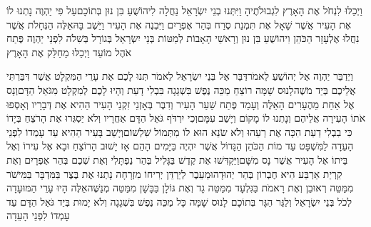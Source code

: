 \documentclass[../main/main.tex]{subfiles}
\begin{document}
\begin{multicols*}{\ncols}
וַיְכַלּוּ לִנְחֹל אֶת הָאָרֶץ לִגְבוּלֹתֶיהָ וַיִּתְּנוּ בְנֵי יִשְׂרָאֵל נַחֲלָה לִיהוֹשֻׁעַ בִּן נוּן בְּתוֹכָם\PreVerseSpace{}עַל פִּי יַהְוֶה נָתְנוּ לוֹ אֶת הָעִיר אֲשֶׁר שָׁאָל אֶת תִּמְנַת סֶרַח בְּהַר אֶפְרָיִם וַיִּבְנֶה אֶת הָעִיר וַיֵּשֶׁב בָּהּ\PreVerseSpace{}אֵלֶּה הַנְּחָלֹת אֲשֶׁר נִחֲלוּ אֶלְעָזָר הַכֹּהֵן וִיהוֹשֻׁעַ בִּן נוּן וְרָאשֵׁי הָאָבוֹת לְמַטּוֹת בְּנֵי יִשְׂרָאֵל בְּגוֹרָל בְּשִׁלֹה לִפְנֵי יַהְוֶה פֶּתַח אֹהֶל מוֹעֵד וַיְכַלּוּ מֵחַלֵּק אֶת הָאָרֶץ\OpenSection{}\par
{}וַיְדַבֵּר יַהְוֶה אֶל יְהוֹשֻׁעַ לֵאמֹר\PreVerseSpace{}דַּבֵּר אֶל בְּנֵי יִשְׂרָאֵל לֵאמֹר תְּנוּ לָכֶם אֶת עָרֵי הַמִּקְלָט אֲשֶׁר דִּבַּרְתִּי אֲלֵיכֶם בְּיַד מֹשֶׁה\PreVerseSpace{}לָנוּס שָׁמָּה רוֹצֵחַ מַכֵּה נֶפֶשׁ בִּשְׁגָגָה בִּבְלִי דָעַת וְהָיוּ לָכֶם לְמִקְלָט מִגֹּאֵל הַדָּם\PreVerseSpace{}וְנָס אֶל אַחַת מֵהֶעָרִים הָאֵלֶּה וְעָמַד פֶּתַח שַׁעַר הָעִיר וְדִבֶּר בְּאָזְנֵי זִקְנֵי הָעִיר הַהִיא אֶת דְּבָרָיו וְאָסְפוּ אֹתוֹ הָעִירָה אֲלֵיהֶם וְנָתְנוּ לוֹ מָקוֹם וְיָשַׁב עִמָּם\PreVerseSpace{}וְכִי יִרְדֹּף גֹּאֵל הַדָּם אַחֲרָיו וְלֹא יַסְגִּרוּ אֶת הָרֹצֵחַ בְּיָדוֹ כִּי בִבְלִי דַעַת הִכָּה אֶת רֵעֵהוּ וְלֹא שֹׂנֵא הוּא לוֹ מִתְּמוֹל שִׁלְשׁוֹם\PreVerseSpace{}וְיָשַׁב בָּעִיר הַהִיא עַד עָמְדוֹ לִפְנֵי הָעֵדָה לַמִּשְׁפָּט עַד מוֹת הַכֹּהֵן הַגָּדוֹל אֲשֶׁר יִהְיֶה בַּיָּמִים הָהֵם אָז יָשׁוּב הָרוֹצֵחַ וּבָא אֶל עִירוֹ וְאֶל בֵּיתוֹ אֶל הָעִיר אֲשֶׁר נָס מִשָּׁם\PreVerseSpace{}וַיַּקְדִּשׁוּ אֶת קֶדֶשׁ בַּגָּלִיל בְּהַר נַפְתָּלִי וְאֶת שְׁכֶם בְּהַר אֶפְרָיִם וְאֶת קִרְיַת אַרְבַּע הִיא חֶבְרוֹן בְּהַר יְהוּדָה\PreVerseSpace{}וּמֵעֵבֶר לְיַרְדֵּן יְרִיחוֹ מִזְרָחָה נָתְנוּ אֶת בֶּצֶר בַּמִּדְבָּר בַּמִּישֹׁר מִמַּטֵּה רְאוּבֵן וְאֶת רָאמֹת בַּגִּלְעָד מִמַּטֵּה גָד וְאֶת גּוֹלָן\SubEnd{} בַּבָּשָׁן מִמַּטֵּה מְנַשֶּׁה\PreVerseSpace{}אֵלֶּה הָיוּ עָרֵי הַמּוּעָדָה לְכֹל בְּנֵי יִשְׂרָאֵל וְלַגֵּר הַגָּר בְּתוֹכָם לָנוּס שָׁמָּה כָּל מַכֵּה נֶפֶשׁ בִּשְׁגָגָה וְלֹא יָמוּת בְּיַד גֹּאֵל הַדָּם עַד עָמְדוֹ לִפְנֵי הָעֵדָה\OpenSection{}\par

\end{multicols*}
\end{document}
